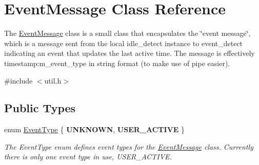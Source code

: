 \hypertarget{classEventMessage}{}\section{Event\+Message Class Reference}
\label{classEventMessage}


The \mbox{\hyperlink{classEventMessage}{Event\+Message}} class is a small class that encapsulates the \char`\"{}event message\char`\"{}, which is a message sent from the local idle\+\_\+detect instance to event\+\_\+detect indicating an event that updates the last active time. The message is effectively timestamp\+:m\+\_\+event\+\_\+type in string format (to make use of pipe easier).  




{\ttfamily \#include $<$util.\+h$>$}

\subsection*{Public Types}
\begin{DoxyCompactItemize}
\item 
\mbox{\label{classEventMessage_a262da559aa416f176fdda72e8b5113ab}} 
enum \mbox{\hyperlink{classEventMessage_a262da559aa416f176fdda72e8b5113ab}{Event\+Type}} \{ {\bfseries U\+N\+K\+N\+O\+WN}, 
{\bfseries U\+S\+E\+R\+\_\+\+A\+C\+T\+I\+VE}
 \}
\begin{DoxyCompactList}\small\item\em The Event\+Type enum defines event types for the \mbox{\hyperlink{classEventMessage}{Event\+Message}} class. Currently there is only one event type in use, U\+S\+E\+R\+\_\+\+A\+C\+T\+I\+VE. \end{DoxyCompactList}\end{DoxyCompactItemize}
